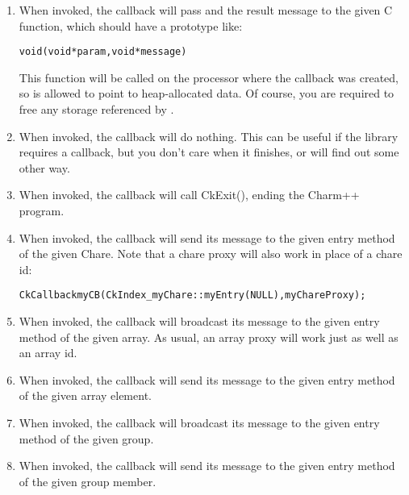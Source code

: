 \begin{enumerate}
\item {} When invoked, the
callback will pass  and the result message to the given C function,
which should have a prototype like:

\begin{alltt}
void (void *param,void *message)
\end{alltt}

This function will be called on the processor where the callback was created,
so  is allowed to point to heap-allocated data.  Of course, you
are required to free any storage referenced by .

\item {} When invoked, the callback
will do nothing.  This can be useful if the library requires a callback,
but you don't care when it finishes, or will find out some other way.

\item {} When invoked, the callback
will call CkExit(), ending the Charm++ program.

\item {} When invoked, the 
callback will send its message to the given entry method of the given
Chare.  Note that a chare proxy will also work in place of a chare id:

\begin{alltt}
	CkCallback myCB(CkIndex_myChare::myEntry(NULL),myChareProxy);
\end{alltt}

\item {} 
When invoked,
the callback will broadcast its message to the given entry method
of the given array.  As usual, an array proxy will work just as well
as an array id.

\item {}
When invoked,
the callback will send its message to the given entry method
of the given array element. 

\item {} 
When invoked,
the callback will broadcast its message to the given entry method
of the given group.

\item {}
When invoked,
the callback will send its message to the given entry method
of the given group member. 

\end{enumerate}

